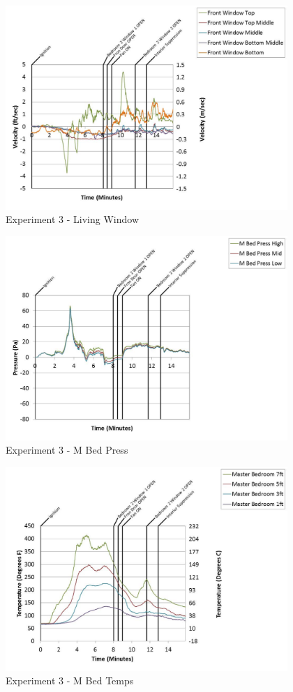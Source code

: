 \documentclass{article}
\begin{document}
\begin{appendices}
	\begin{figure}[h!]
		\centering
		\includegraphics[height=3.05in]{0_Images/Results_Charts/Exp_3_Charts/LivingWindow.pdf}
		\caption{Experiment 3 - Living Window}
	\end{figure}
 
	\clearpage

	\begin{figure}[h!]
		\centering
		\includegraphics[height=3.05in]{0_Images/Results_Charts/Exp_3_Charts/MBedPress.pdf}
		\caption{Experiment 3 - M Bed Press}
	\end{figure}
 

	\begin{figure}[h!]
		\centering
		\includegraphics[height=3.05in]{0_Images/Results_Charts/Exp_3_Charts/MBedTemps.pdf}
		\caption{Experiment 3 - M Bed Temps}
	\end{figure}
 

\end{appendices}
\end{document}
